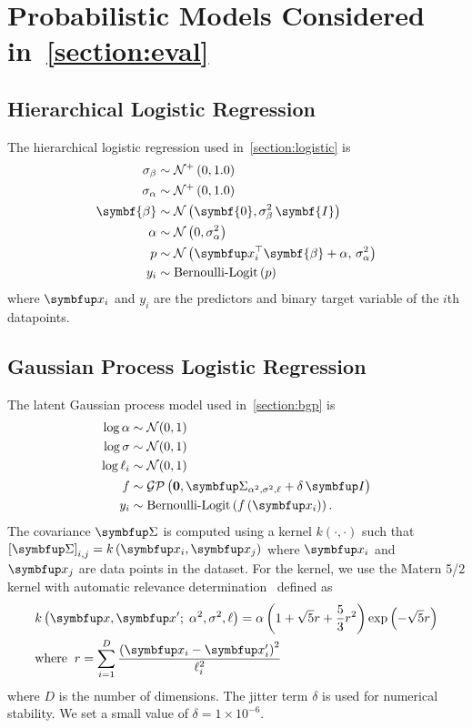 
\section{Probabilistic Models Considered in~\cref{section:eval}}
\subsection{Hierarchical Logistic Regression}
The hierarchical logistic regression used in~\cref{section:logistic} is 
\begin{align*}
    \sigma_{\beta}  &\sim \mathcal{N}^+\left(0, 1.0\right) \\
    \sigma_{\alpha} &\sim \mathcal{N}^+\left(0, 1.0\right) \\
    \symbf{\beta} &\sim \mathcal{N}\left(\symbf{0}, \sigma_{\beta}^2\,\symbf{I}\right) \\
    \alpha        &\sim \mathcal{N}\left(0, \sigma_{\alpha}^2\right) \\
    p             &\sim \mathcal{N}\left(\vx_i^{\top}\symbf{\beta} + \alpha,\, \sigma_{\alpha}^2\right)\\
    y_i           &\sim \text{Bernoulli-Logit}\,(p)
\end{align*}
where \(\vx_i\) and \(y_i\) are the predictors and binary target variable of the \(i\)th datapoints.

\subsection{Gaussian Process Logistic Regression}
The latent Gaussian process model used in~\cref{section:bgp} is 
\begin{align*}
   \log \alpha &\sim \mathcal{N}(0, 1) \\
   \log \sigma &\sim \mathcal{N}(0, 1) \\
   \log \ell_i &\sim \mathcal{N}(0, 1) \\
   f &\sim \mathcal{GP}\left(\mathbf{0}, \mSigma_{\alpha^2, \sigma^2, \mathbf{\ell}} + \delta\,\mI \right) \\
   y_i &\sim \text{Bernoulli-Logit}\left(  f\left( \vx_i \right) \right).
\end{align*}
The covariance \(\mSigma\) is computed using a kernel \(k\left(\cdot, \cdot\right)\) such that \({[\mSigma]}_{i,j} = k\left( \vx_{i}, \vx_{j} \right) \) where \(\vx_i\) and \(\vx_j\) are data points in the dataset.
For the kernel, we use the Matern 5/2 kernel with automatic relevance determination~\citep{neal_bayesian_1996} defined as
\begin{align}
  &k\left(\vx, \vx' ;\; \alpha^2, \sigma^2, \mathbf{\ell} \right) =
  \alpha \left( 1 + \sqrt{5} r + \frac{5}{3} r^2 \right) \exp\left( - \sqrt{5} r \right) \\
  &\text{where}\;\; r = \sum^{D}_{i=1} \frac{ {\left(\vx_i - \vx'_i\right)}^2 }{\ell^2_i}
\end{align}
where \(D\) is the number of dimensions.
The jitter term \(\delta\) is used for numerical stability.
We set a small value of \(\delta = 1\times10^{-6}\).

